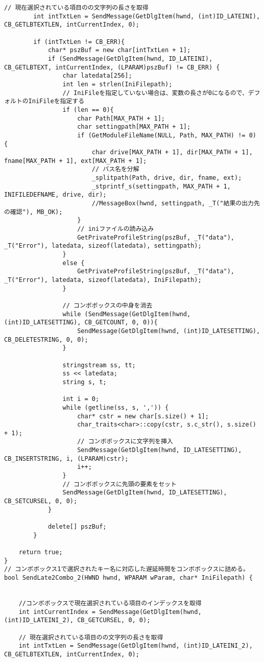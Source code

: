 \begin{lstlisting}[caption=main.cpp]
		// 現在選択されている項目のの文字列の長さを取得
		int intTxtLen = SendMessage(GetDlgItem(hwnd, (int)ID_LATEINI), CB_GETLBTEXTLEN, intCurrentIndex, 0);

		if (intTxtLen != CB_ERR){
			char* pszBuf = new char[intTxtLen + 1];
			if (SendMessage(GetDlgItem(hwnd, ID_LATEINI), CB_GETLBTEXT, intCurrentIndex, (LPARAM)pszBuf) != CB_ERR) {
				char latedata[256];
				int len = strlen(IniFilepath);
				// IniFileを指定していない場合は、変数の長さが0になるので、デフォルトのIniFileを指定する
				if (len == 0){
					char Path[MAX_PATH + 1];
					char settingpath[MAX_PATH + 1];
					if (GetModuleFileName(NULL, Path, MAX_PATH) != 0) {
						char drive[MAX_PATH + 1], dir[MAX_PATH + 1], fname[MAX_PATH + 1], ext[MAX_PATH + 1];
						// パス名を分解
						_splitpath(Path, drive, dir, fname, ext);
						_stprintf_s(settingpath, MAX_PATH + 1, INIFILEDEFNAME, drive, dir);
						//MessageBox(hwnd, settingpath, _T("結果の出力先の確認"), MB_OK);
					}
					// iniファイルの読み込み
					GetPrivateProfileString(pszBuf, _T("data"), _T("Error"), latedata, sizeof(latedata), settingpath);
				}
				else {
					GetPrivateProfileString(pszBuf, _T("data"), _T("Error"), latedata, sizeof(latedata), IniFilepath);
				}

				// コンボボックスの中身を消去
				while (SendMessage(GetDlgItem(hwnd, (int)ID_LATESETTING), CB_GETCOUNT, 0, 0)){
					SendMessage(GetDlgItem(hwnd, (int)ID_LATESETTING), CB_DELETESTRING, 0, 0);
				}

				stringstream ss, tt;
				ss << latedata;
				string s, t;

				int i = 0;
				while (getline(ss, s, ',')) {
					char* cstr = new char[s.size() + 1];
					char_traits<char>::copy(cstr, s.c_str(), s.size() + 1);
					// コンボボックスに文字列を挿入
					SendMessage(GetDlgItem(hwnd, ID_LATESETTING), CB_INSERTSTRING, i, (LPARAM)cstr);
					i++;
				}
				// コンボボックスに先頭の要素をセット
				SendMessage(GetDlgItem(hwnd, ID_LATESETTING), CB_SETCURSEL, 0, 0);
			}
			
			delete[] pszBuf;
		}
	
	return true;
}
// コンボボックス1で選択されたキー名に対応した遅延時間をコンボボックスに詰める。
bool SendLate2Combo_2(HWND hwnd, WPARAM wParam, char* IniFilepath) {


	//コンボボックスで現在選択されている項目のインデックスを取得
	int intCurrentIndex = SendMessage(GetDlgItem(hwnd, (int)ID_LATEINI_2), CB_GETCURSEL, 0, 0);

	// 現在選択されている項目のの文字列の長さを取得
	int intTxtLen = SendMessage(GetDlgItem(hwnd, (int)ID_LATEINI_2), CB_GETLBTEXTLEN, intCurrentIndex, 0);


\end{lstlisting}
